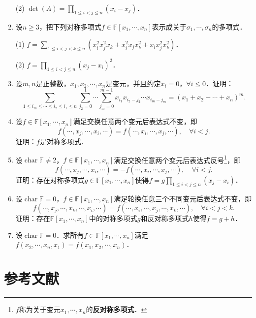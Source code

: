 \documentclass[a4paper,fontset=windows]{ctexbook}
\theoremstyle{definition}
\DeclareMathOperator{\Char}{char}
\renewcommand{\le}{\leqslant}
\renewcommand{\ge}{\geqslant}
\begin{document}
\begin{enumerate}
(2) $\det(A)=\prod\limits_{1\le i<j\le n}(x_i-x_j)$．

\item 设$n\ge 3$，把下列对称多项式$f\in\mathbb{F}[x_1,\cdots,x_n]$表示成关于$\sigma_1,\cdots,\sigma_n$的多项式．

(1) $f=\sum\limits_{1\le i<j<k\le n}(x_i^2x_j^2x_k+x_i^2x_jx_k^2+x_ix_j^2x_k^2)$．

(2) $f=\prod\limits_{1\le i<j\le n}(x_j-x_i)^2$．

\item 设$m,n$是正整数，$x_1,x_2,\cdots,x_n$是变元，并且约定$x_i=0$，$\forall i\le 0$．证明：
$$\sum\limits_{1\le i_m\le\cdots\le i_2\le i_1\le n}\sum_{j_2=0}^1\cdots\sum_{j_m=0}^{m-1}x_{i_1}x_{i_2-j_2}\cdots x_{i_m-j_m}=(x_1+x_2+\cdots+x_n)^m.$$

\item 设$f\in\mathbb{F}[x_1,\cdots,x_n]$满足交换任意两个变元后表达式不变，即
$$f(\cdots,x_j,\cdots,x_i,\cdots)=f(\cdots,x_i,\cdots,x_j,\cdots),\quad\forall i<j.$$
证明：$f$是对称多项式．

\item 设$\Char\mathbb{F}\ne 2$，$f\in\mathbb{F}[x_1,\cdots,x_n]$满足交换任意两个变元后表达式反号\footnote{$f$称为关于变元$x_1,\cdots,x_n$的{\bf 反对称多项式}．}，即
$$f(\cdots,x_j,\cdots,x_i,\cdots)=-f(\cdots,x_i,\cdots,x_j,\cdots),\quad\forall i<j.$$
证明：存在对称多项式$g\in\mathbb{F}[x_1,\cdots,x_n]$使得$f=g\prod\limits_{1\le i<j\le n}(x_j-x_i)$．

\item 设$\Char\mathbb{F}=0$，$f\in\mathbb{F}[x_1,\cdots,x_n]$满足轮换任意三个不同变元后表达式不变，即
$$f(\cdots,x_j,\cdots,x_k,\cdots,x_i,\cdots)=f(\cdots,x_i,\cdots,x_j,\cdots,x_k,\cdots),\quad\forall i<j<k.$$
证明：存在$\mathbb{F}[x_1,\cdots,x_n]$中的对称多项式$g$和反对称多项式$h$使得$f=g+h$．

\item 设$\Char\mathbb{F}=0$．求所有$f\in\mathbb{F}[x_1,\cdots,x_n]$满足$f(x_2,\cdots,x_n,x_1)=f(x_1,x_2,\cdots,x_n)$．

\end{enumerate}

\chapter*{参考文献}
\end{document}
